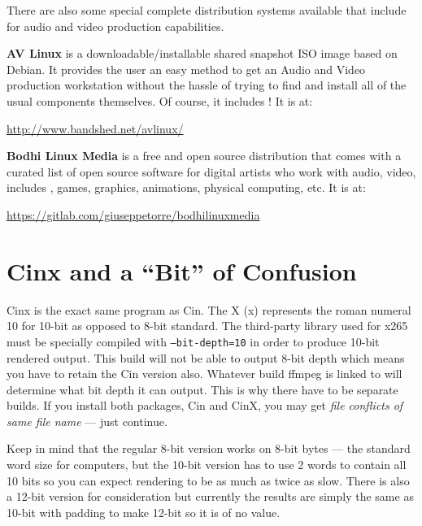 There are also some special complete distribution systems available that include \CGG{} for audio and video production capabilities.

\textbf{AV Linux} is a downloadable/installable shared snapshot ISO image based on Debian. 
It provides the user an easy method to get an Audio and Video production workstation without the hassle of trying to find and install all of the usual components themselves. 
Of course, it includes \CGG{}!  
It is at:

\begin{center}
	{\small \url{http://www.bandshed.net/avlinux/}}
\end{center}

\textbf{Bodhi Linux Media} is a free and open source distribution that comes with a curated list of open source software for digital artists who work with audio, video, includes \CGG{}, games, graphics, animations, physical computing, etc.  
It is at:

\begin{center}
	{\small \url{https://gitlab.com/giuseppetorre/bodhilinuxmedia}}
\end{center}	

\section{Cinx and a “Bit” of Confusion}%
\label{sec:cinx_and_a_bit_of_confusion}

Cinx is the exact same program as Cin.  
The X (x) represents the roman numeral 10 for 10-bit as opposed to 8-bit standard.  
The third-party library used for x265 must be specially compiled with \texttt{--bit-depth=10} in order to produce 10-bit rendered output.  
This build will not be able to output 8-bit depth which means you have to retain the Cin version also.  
Whatever build ffmpeg is linked to will determine what bit depth it can output.  
This is why there have to be separate builds.  
If you install both packages, Cin and CinX, you may get \textit{file conflicts of same file name} --- just continue.

Keep in mind that the regular 8-bit version works on 8-bit bytes --- the standard word size for computers, but the 10-bit version has to use 2 words to contain all 10 bits so you can expect rendering to be as much as twice as slow.  
There is also a 12-bit version for consideration but currently the results are simply the same as 10-bit with padding to make 12-bit so it is of no value.

















